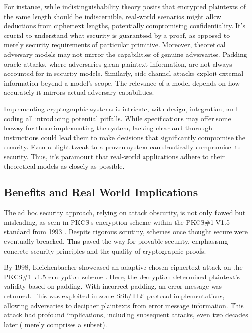 \documentclass[]{final_report}
\theoremstyle{definition}
\begin{document}
For instance, while indistinguishability theory posits that encrypted plaintexts of the same length should be indiscernible, real-world scenarios might allow deductions from ciphertext lengths, potentially compromising confidentiality. It's crucial to understand what security is guaranteed by a proof, as opposed to merely security requirements of particular primitive. Moreover, theoretical adversary models may not mirror the capabilities of genuine adversaries. Padding oracle attacks, where adversaries glean plaintext information, are not always accounted for in security models. Similarly, side-channel attacks exploit external information beyond a model's scope. The relevance of a model depends on how accurately it mirrors actual adversary capabilities.

Implementing cryptographic systems is intricate, with design, integration, and coding all introducing potential pitfalls. While specifications may offer some leeway for those implementing the system, lacking clear and thorough instructions could lead them to make decisions that significantly compromise the security. Even a slight tweak to a proven system can drastically compromise its security. Thus, it's paramount that real-world applications adhere to their theoretical models as closely as possible.


\subsection{Benefits and Real World Implications}
The ad hoc security approach, relying on attack obscurity, is not only flawed but misleading, as seen in PKCS's encryption scheme within the PKCS\#1 V1.5 standard from 1993 \cite{rfc2313}. Despite rigorous scrutiny, schemes once thought secure were eventually breached. This paved the way for provable security, emphasising concrete security principles and the quality of cryptographic proofs.

By 1998, Bleichenbacher showcased an adaptive chosen-ciphertext attack on the PKCS\#1 v1.5 encryption scheme \cite{bleichenbacher1998chosen}. Here, the decryption determined plaintext's validity based on padding. With incorrect padding, an error message was returned. This was exploited in some SSL/TLS protocol implementations, allowing adversaries to decipher plaintexts from error message information. This attack had profound implications, including subsequent attacks, even two decades later (\cite{coppersmith1996low, coron2000new, 10.1007/978-3-540-45238-6_33, degabriele2012joint, bardou2012efficient, meyer2014revisiting, zhang2014cross, jager2015security, jager2015practical, bock2018return} merely comprises a subset).
\end{document}
